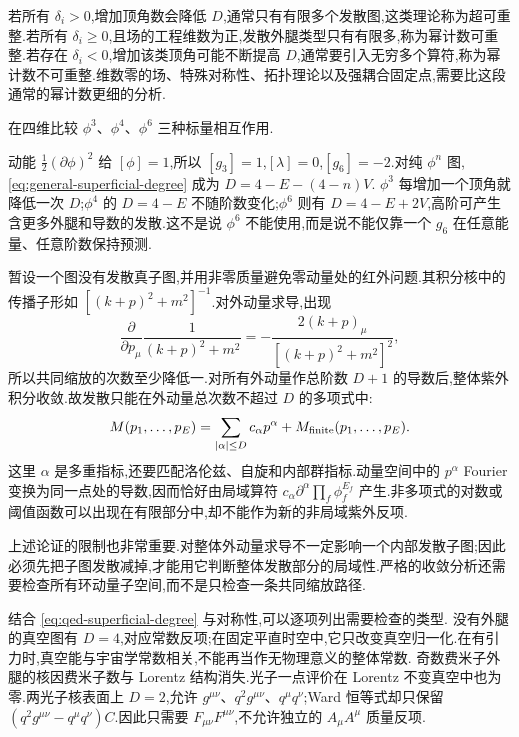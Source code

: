 若所有 $\delta_i>0$,增加顶角数会降低 $D$,通常只有有限多个发散图,这类理论称为超可重整.若所有 $\delta_i\geq0$,且场的工程维数为正,发散外腿类型只有有限多,称为幂计数可重整.若存在 $\delta_i<0$,增加该类顶角可能不断提高 $D$,通常要引入无穷多个算符,称为幂计数不可重整.维数零的场、特殊对称性、拓扑理论以及强耦合固定点,需要比这段通常的幂计数更细的分析.

\begin{example}
在四维比较 $\phi^3$、$\phi^4$、$\phi^6$ 三种标量相互作用.
\end{example}
\begin{solution}
动能 $\tfrac12(\partial\phi)^2$ 给 $[\phi]=1$,所以 $[g_3]=1$,$[\lambda]=0$,$[g_6]=-2$.对纯 $\phi^n$ 图,\eqref{eq:general-superficial-degree} 成为
$D=4-E-(4-n)V$.
$\phi^3$ 每增加一个顶角就降低一次 $D$;$\phi^4$ 的 $D=4-E$ 不随阶数变化;$\phi^6$ 则有 $D=4-E+2V$,高阶可产生含更多外腿和导数的发散.这不是说 $\phi^6$ 不能使用,而是说不能仅靠一个 $g_6$ 在任意能量、任意阶数保持预测.
\end{solution}


暂设一个图没有发散真子图,并用非零质量避免零动量处的红外问题.其积分核中的传播子形如 $[(k+p)^2+m^2]^{-1}$.对外动量求导,出现
\begin{equation}
 \frac{\partial}{\partial p_\mu}\frac1{(k+p)^2+m^2}
 =-\frac{2(k+p)_\mu}{[(k+p)^2+m^2]^2},
\end{equation}
所以共同缩放的次数至少降低一.对所有外动量作总阶数 $D+1$ 的导数后,整体紫外积分收敛.故发散只能在外动量总次数不超过 $D$ 的多项式中:
\begin{equation}
 M(p_1,\ldots,p_E)
 =\sum_{|\alpha|\leq D}c_\alpha p^\alpha+M_{\rm finite}(p_1,\ldots,p_E).
 \label{eq:local-divergent-polynomial}
\end{equation}
这里 $\alpha$ 是多重指标,还要匹配洛伦兹、自旋和内部群指标.动量空间中的 $p^\alpha$ Fourier 变换为同一点处的导数,因而恰好由局域算符
$c_\alpha\partial^\alpha\prod_f\phi_f^{E_f}$ 产生.非多项式的对数或阈值函数可以出现在有限部分中,却不能作为新的非局域紫外反项.

上述论证的限制也非常重要.对整体外动量求导不一定影响一个内部发散子图;因此必须先把子图发散减掉,才能用它判断整体发散部分的局域性.严格的收敛分析还需要检查所有环动量子空间,而不是只检查一条共同缩放路径.


结合 \eqref{eq:qed-superficial-degree} 与对称性,可以逐项列出需要检查的类型.
没有外腿的真空图有 $D=4$,对应常数反项;在固定平直时空中,它只改变真空归一化.在有引力时,真空能与宇宙学常数相关,不能再当作无物理意义的整体常数.
奇数费米子外腿的核因费米子数与 Lorentz 结构消失.光子一点评价在 Lorentz 不变真空中也为零.两光子核表面上 $D=2$,允许 $g^{\mu\nu}$、$q^2g^{\mu\nu}$、$q^\mu q^\nu$;Ward 恒等式却只保留 $(q^2g^{\mu\nu}-q^\mu q^\nu)C$.因此只需要 $F_{\mu\nu}F^{\mu\nu}$,不允许独立的 $A_\mu A^\mu$ 质量反项.

